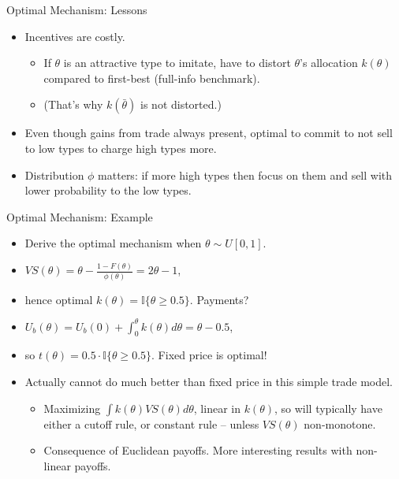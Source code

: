 \documentclass[english,10pt
,aspectratio=169
]{beamer}
\begin{document}
\begin{frame}{Optimal Mechanism: Lessons}
\begin{itemize}
	\item Incentives are costly.
	\begin{itemize}
		\item If $\theta$ is an attractive type to imitate, have to distort $\theta$'s allocation $k(\theta)$ compared to first-best (full-info benchmark).
		\item (That's why $k(\bar{\theta})$ is not distorted.)
	\end{itemize}
	\item Even though gains from trade always present, optimal to commit to not sell to low types to charge high types more.
	\item Distribution $\phi$ matters: if more high types then focus on them and sell with lower probability to the low types.
\end{itemize}
\end{frame}


\begin{frame}{Optimal Mechanism: Example}
\begin{itemize}[<+->]
	\item Derive the optimal mechanism when $\theta \sim U[0,1]$.
	\item $VS(\theta) = \theta - \frac{1-F(\theta)}{\phi(\theta)} = 2 \theta - 1$,
	\item hence optimal $k(\theta) = \mathbb{I} \{\theta \geq 0.5 \}$. Payments?
	\item $U_b (\theta) = U_b(0) + \int_0^\theta k(\theta) d\theta = \theta - 0.5$,
	\item so $t(\theta) = 0.5 \cdot \mathbb{I} \{\theta \geq 0.5 \}$. Fixed price is optimal!
	\item Actually cannot do much better than fixed price in this simple trade model.
	\begin{itemize}
		\item Maximizing $\int k(\theta) VS(\theta) d\theta$, linear in $k(\theta)$, so will typically have either a cutoff rule, or constant rule -- unless $VS(\theta)$ non-monotone.
		\item Consequence of Euclidean payoffs. More interesting results with non-linear payoffs.
	\end{itemize}
\end{itemize}
\end{frame}
\end{document}
